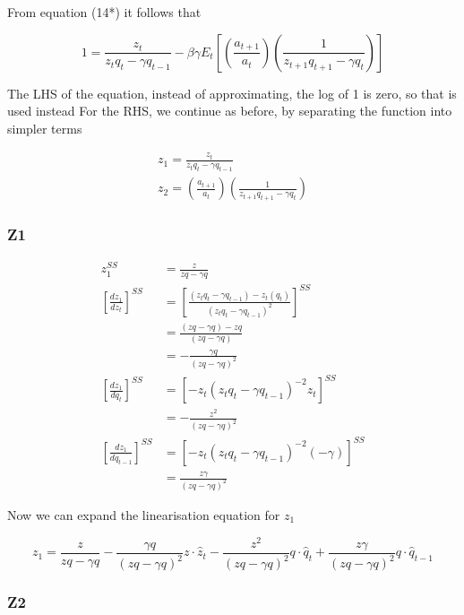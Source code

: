\documentclass[11pt,preprint, authoryear]{elsarticle}
\numberwithin{equation}{section}
\numberwithin{figure}{section}
\numberwithin{table}{section}
\begin{document}
From equation (14*) it follows that

\[1=\frac{z_{t}}{z_{t} q_{t}-\gamma q_{t-1}}-\beta \gamma E_{t}\left[\left(\frac{a_{t+1}}{a_{t}}\right)\left(\frac{1}{z_{t+1} q_{t+1}-\gamma q_{t}}\right)\right]\]

The LHS of the equation, instead of approximating, the log of 1 is zero,
so that is used instead For the RHS, we continue as before, by
separating the function into simpler terms

\[\begin{aligned}
z_1 = \frac{z_{t}}{z_{t} q_{t}-\gamma q_{t-1}} \\
z_2 = \left(\frac{a_{t+1}}{a_{t}}\right)\left(\frac{1}{z_{t+1} q_{t+1}-\gamma q_{t}}\right)
\end{aligned}\]

\hypertarget{z1}{%
\subsubsection{Z1}\label{z1}}

\[\begin{aligned}
z_{1}^{SS}&= \frac{z}{z q-\gamma q} \\
\left[\frac{dz_{1}}{dz_{t}} \right]^{SS} &=
\left[\frac{\left(z_{t} q_{t}-\gamma q_{t-1}\right)-z_{t}\left(q_{t}\right)}{\left(z_{t} q_{t}-\gamma 
q_{t-1}\right)^{2}}\right]^{SS}\\
&=\frac{(z q-\gamma q)-z q}{(z q-\gamma q)}\\
&=-\frac{\gamma q}{(zq-\gamma q)^2}\\
\left[\frac{dz_{1}}{dq_{t}} \right]^{SS} &= \left[-z_{t}\left(z_{t} q_{t}-\gamma q_{t-1}\right)^{-2} z_{t} \right]^{SS} \\
&= -\frac{z^{2}}{\left(z q-\gamma q\right)^2}\\
\left[\frac{dz_{1}}{dq_{t-1}} \right]^{SS} &= \left[-z_{t}\left(z_{t} q_{t}-\gamma q_{t-1}\right)^{-2}(-\gamma)\right]^{SS} \\
&=\frac{z \gamma}{(z q-\gamma q)^2}
\end{aligned}\]

Now we can expand the linearisation equation for \(z_1\)

\[z_1 = \frac{z}{z q-\gamma q} 
- \frac{\gamma q}{(z q-\gamma q)^2} z \cdot \hat{z}_t
- \frac{z^{2}}{(z q-\gamma q)^2} q \cdot \hat{q}_t
+ \frac{z \gamma}{(z q-\gamma q)^2} q \cdot \hat{q}_{t-1}\]

\hypertarget{z2}{%
\subsubsection{Z2}\label{z2}}
\end{document}
